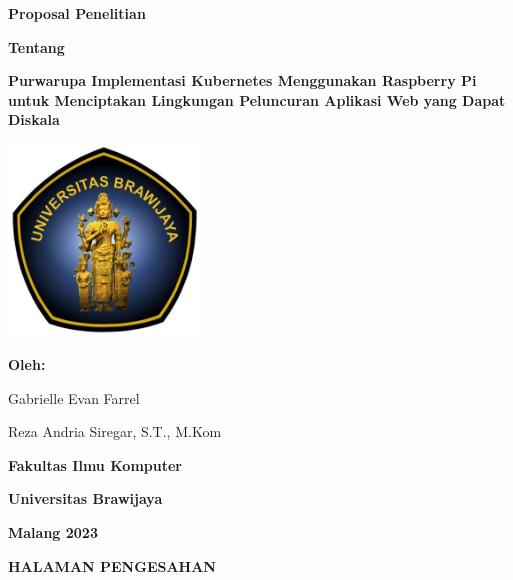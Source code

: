 \documentclass[a4paper,12pt]{article}
\numberwithin{figure}{section}
\numberwithin{table}{section}
\begin{document}
\begin{titlepage}
\begin{center}
\textbf{\huge Proposal Penelitian}\vspace{1cm}

\textbf{\Large Tentang}\vspace{1cm}

\textbf{\LARGE Purwarupa Implementasi Kubernetes Menggunakan Raspberry Pi untuk Menciptakan Lingkungan Peluncuran Aplikasi Web yang Dapat Diskala}\vspace{3cm}

\includegraphics[width=2in]{pictures/cover_ub.png}\vspace{3cm}

\textbf{\large Oleh:}\vspace{0.5cm}

Gabrielle Evan Farrel\vspace{0.25cm}

Reza Andria Siregar, S.T., M.Kom\vspace{1cm}

\textbf{\Large Fakultas Ilmu Komputer}

\textbf{\Large Universitas Brawijaya}

\textbf{\Large Malang 2023}
\end{center}
\end{titlepage}

\begin{center}
{\Large \textbf{HALAMAN PENGESAHAN}}
\end{center}
\end{document}
